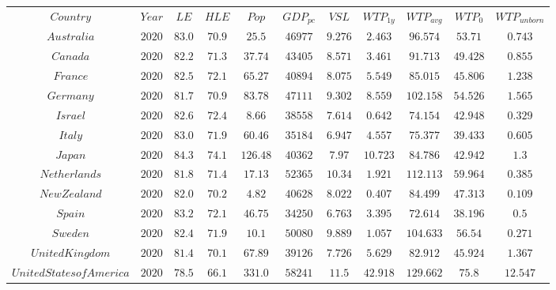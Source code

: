 \begin{tabular}{ccccccccccc}
$Country$ & $Year$ & $LE$ & $HLE$ & $Pop$ & $GDP_{pc}$ & $VSL$ & $WTP_{1y}$ & $WTP_{avg}$ & $WTP_{0}$ & $WTP_{unborn}$\\
$Australia$ & $2020$ & $83.0$ & $70.9$ & $25.5$ & $46977$ & $9.276$ & $2.463$ & $96.574$ & $53.71$ & $0.743$\\
$Canada$ & $2020$ & $82.2$ & $71.3$ & $37.74$ & $43405$ & $8.571$ & $3.461$ & $91.713$ & $49.428$ & $0.855$\\
$France$ & $2020$ & $82.5$ & $72.1$ & $65.27$ & $40894$ & $8.075$ & $5.549$ & $85.015$ & $45.806$ & $1.238$\\
$Germany$ & $2020$ & $81.7$ & $70.9$ & $83.78$ & $47111$ & $9.302$ & $8.559$ & $102.158$ & $54.526$ & $1.565$\\
$Israel$ & $2020$ & $82.6$ & $72.4$ & $8.66$ & $38558$ & $7.614$ & $0.642$ & $74.154$ & $42.948$ & $0.329$\\
$Italy$ & $2020$ & $83.0$ & $71.9$ & $60.46$ & $35184$ & $6.947$ & $4.557$ & $75.377$ & $39.433$ & $0.605$\\
$Japan$ & $2020$ & $84.3$ & $74.1$ & $126.48$ & $40362$ & $7.97$ & $10.723$ & $84.786$ & $42.942$ & $1.3$\\
$Netherlands$ & $2020$ & $81.8$ & $71.4$ & $17.13$ & $52365$ & $10.34$ & $1.921$ & $112.113$ & $59.964$ & $0.385$\\
$New Zealand$ & $2020$ & $82.0$ & $70.2$ & $4.82$ & $40628$ & $8.022$ & $0.407$ & $84.499$ & $47.313$ & $0.109$\\
$Spain$ & $2020$ & $83.2$ & $72.1$ & $46.75$ & $34250$ & $6.763$ & $3.395$ & $72.614$ & $38.196$ & $0.5$\\
$Sweden$ & $2020$ & $82.4$ & $71.9$ & $10.1$ & $50080$ & $9.889$ & $1.057$ & $104.633$ & $56.54$ & $0.271$\\
$United Kingdom$ & $2020$ & $81.4$ & $70.1$ & $67.89$ & $39126$ & $7.726$ & $5.629$ & $82.912$ & $45.924$ & $1.367$\\
$United States of America$ & $2020$ & $78.5$ & $66.1$ & $331.0$ & $58241$ & $11.5$ & $42.918$ & $129.662$ & $75.8$ & $12.547$\\
\end{tabular}

